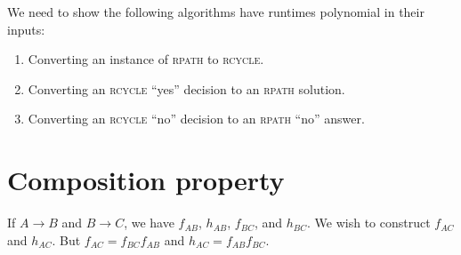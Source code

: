 We need to show the following algorithms have runtimes polynomial in their inputs:
\begin{enumerate}
	\item Converting an instance of \textsc{rpath} to \textsc{rcycle}.
	\item Converting an \textsc{rcycle} ``yes'' decision to an \textsc{rpath} solution.
	\item Converting an \textsc{rcycle} ``no'' decision to an \textsc{rpath} ``no'' answer.
\end{enumerate}

\section{Composition property}
If \(A\to B\) and \(B\to C\), we have \(f_{AB}\), \(h_{AB}\), \(f_{BC}\), and \(h_{BC}\). We wish to construct \(f_{AC}\) and \(h_{AC}\). But \(f_{AC} = f_{BC}f_{AB}\) and \(h_{AC} = f_{AB}f_{BC}\).